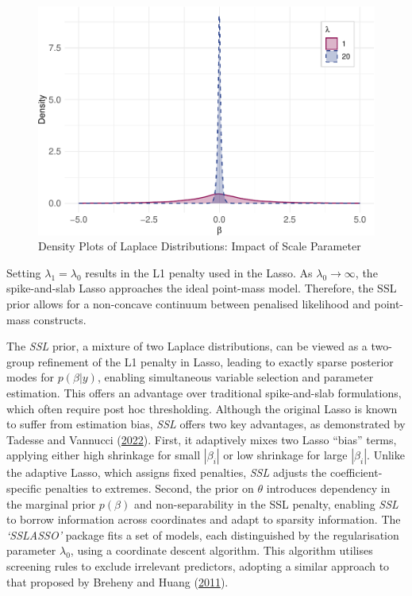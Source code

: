 \documentclass[
  11pt,
]{article}
\begin{document}
\begin{figure}

{\centering \includegraphics[width=0.75\linewidth]{dissertation_files/figure-latex/SSLASSO Priors-1} 

}

\caption{Density Plots of Laplace Distributions: Impact of Scale Parameter}\label{fig:SSLASSO Priors}
\end{figure}

Setting \(\lambda_1 = \lambda_0\) results in the L1 penalty used in the
Lasso. As \(\lambda_0 \rightarrow \infty\), the spike-and-slab Lasso
approaches the ideal point-mass model. Therefore, the SSL prior allows
for a non-concave continuum between penalised likelihood and point-mass
constructs.

The \emph{SSL} prior, a mixture of two Laplace distributions, can be
viewed as a two-group refinement of the L1 penalty in Lasso, leading to
exactly sparse posterior modes for \(p(\beta | y)\), enabling
simultaneous variable selection and parameter estimation. This offers an
advantage over traditional spike-and-slab formulations, which often
require post hoc thresholding. Although the original Lasso is known to
suffer from estimation bias, \emph{SSL} offers two key advantages, as
demonstrated by Tadesse and Vannucci
(\protect\hyperlink{ref-Tadesse2022}{2022}). First, it adaptively mixes
two Lasso ``bias'' terms, applying either high shrinkage for small
\(|\beta_i|\) or low shrinkage for large \(|\beta_i|\). Unlike the
adaptive Lasso, which assigns fixed penalties, \emph{SSL} adjusts the
coefficient-specific penalties to extremes. Second, the prior on
\(\theta\) introduces dependency in the marginal prior \(p(\beta)\) and
non-separability in the SSL penalty, enabling \emph{SSL} to borrow
information across coordinates and adapt to sparsity information. The
\emph{`SSLASSO'} package fits a set of models, each distinguished by the
regularisation parameter \(\lambda_0\), using a coordinate descent
algorithm. This algorithm utilises screening rules to exclude irrelevant
predictors, adopting a similar approach to that proposed by Breheny and
Huang (\protect\hyperlink{ref-Breheny2011}{2011}).
\end{document}
